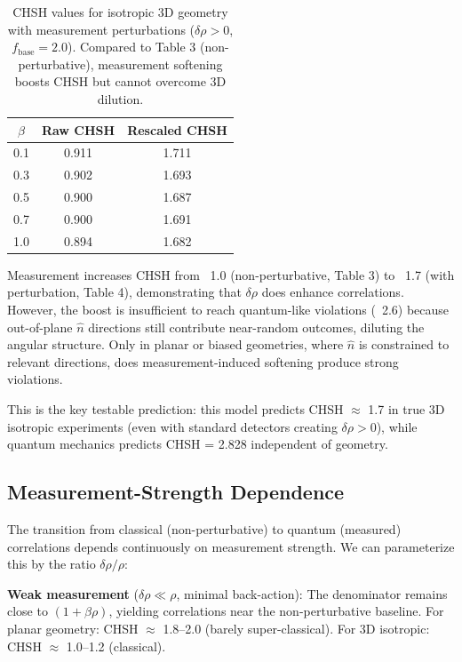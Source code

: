 \documentclass[11pt,a4paper]{article}
\theoremstyle{definition}
\theoremstyle{remark}
\begin{document}
\begin{table}[h]
\centering
\caption{CHSH values for isotropic 3D geometry with measurement perturbations ($\delta\rho > 0$, $f_{\mathrm{base}}=2.0$). Compared to Table 3 (non-perturbative), measurement softening boosts CHSH but cannot overcome 3D dilution.}
\label{P8:tab:isotropic_measured_chsh}
\begin{tabular}{c|c|c}
\hline
$\beta$ & Raw CHSH & Rescaled CHSH \\
\hline
0.1 & 0.911 & 1.711 \\
0.3 & 0.902 & 1.693 \\
0.5 & 0.900 & 1.687 \\
0.7 & 0.900 & 1.691 \\
1.0 & 0.894 & 1.682 \\
\hline
\end{tabular}
\end{table}

Measurement increases CHSH from ~1.0 (non-perturbative, Table 3) to ~1.7 (with perturbation, Table 4), demonstrating that $\delta\rho$ does enhance correlations. However, the boost is insufficient to reach quantum-like violations (~2.6) because out-of-plane $\hat{n}$ directions still contribute near-random outcomes, diluting the angular structure. Only in planar or biased geometries, where $\hat{n}$ is constrained to relevant directions, does measurement-induced softening produce strong violations.

This is the key testable prediction: this model predicts CHSH $\approx$ 1.7 in true 3D isotropic experiments (even with standard detectors creating $\delta\rho > 0$), while quantum mechanics predicts CHSH = 2.828 independent of geometry.

\subsection{Measurement-Strength Dependence}

The transition from classical (non-perturbative) to quantum (measured) correlations depends continuously on measurement strength. We can parameterize this by the ratio $\delta\rho / \rho$:

\textbf{Weak measurement} ($\delta\rho \ll \rho$, minimal back-action): The denominator remains close to $(1 + \beta\rho)$, yielding correlations near the non-perturbative baseline. For planar geometry: CHSH $\approx$ 1.8--2.0 (barely super-classical). For 3D isotropic: CHSH $\approx$ 1.0--1.2 (classical).
\end{document}
